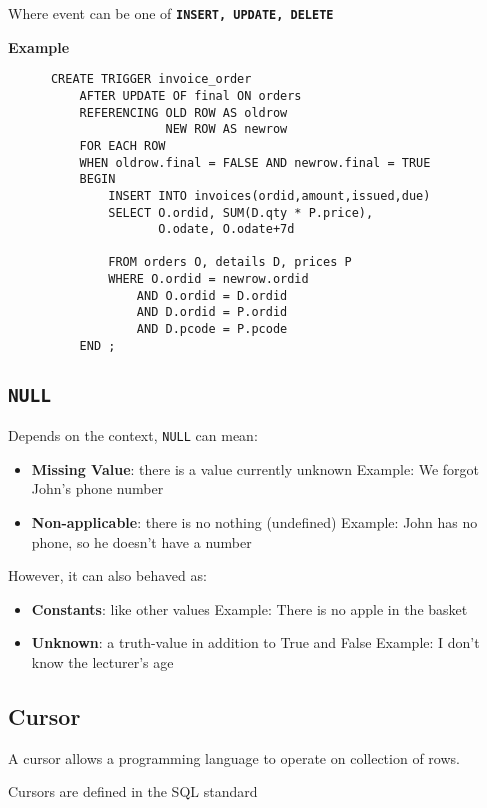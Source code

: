 \documentclass{article}
\begin{document}
Where event can be one of \texttt{\textbf{INSERT, UPDATE, DELETE}}

\textbf{Example}
\begin{lstlisting}
      CREATE TRIGGER invoice_order
          AFTER UPDATE OF final ON orders
          REFERENCING OLD ROW AS oldrow
                      NEW ROW AS newrow
          FOR EACH ROW
          WHEN oldrow.final = FALSE AND newrow.final = TRUE
          BEGIN
              INSERT INTO invoices(ordid,amount,issued,due)
              SELECT O.ordid, SUM(D.qty * P.price),
                     O.odate, O.odate+7d

              FROM orders O, details D, prices P
              WHERE O.ordid = newrow.ordid
                  AND O.ordid = D.ordid
                  AND D.ordid = P.ordid
                  AND D.pcode = P.pcode
          END ;
    \end{lstlisting}

\subsection{\texttt{\textbf{NULL}}}
Depends on the context, \texttt{NULL} can mean: \begin{itemize}
  \item \textbf{Missing Value}: there is a value currently unknown
        \subitem Example: We forgot John's phone number
  \item \textbf{Non-applicable}: there is no nothing (undefined)
        \subitem Example: John has no phone, so he doesn't have a number
\end{itemize}

However, it can also behaved as: \begin{itemize}
  \item \textbf{Constants}: like other values
        \subitem Example: There is no apple in the basket
  \item \textbf{Unknown}: a truth-value in addition to True and False
        \subitem Example: I don't know the lecturer's age
\end{itemize}

\subsection{Cursor}

A cursor allows a programming language to operate on collection of rows.

Cursors are defined in the SQL standard
\end{document}
